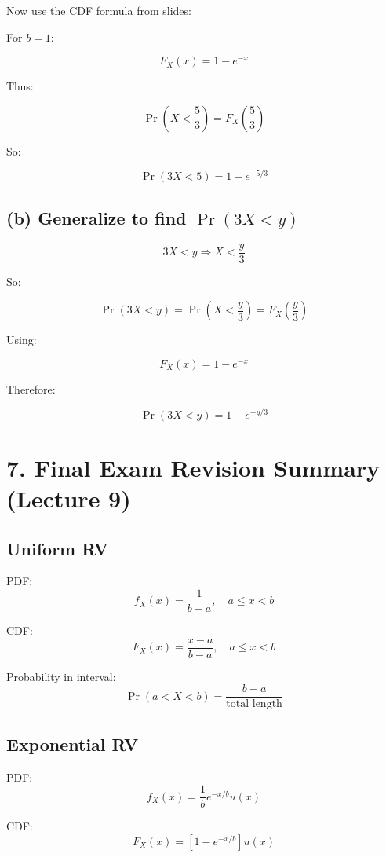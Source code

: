 \documentclass{article}
\begin{document}
Now use the CDF formula from slides:

For $b=1$:

\[
F_X(x)=1-e^{-x}
\]

Thus:

\[
\Pr\left(X<\frac{5}{3}\right)=F_X\left(\frac{5}{3}\right)
\]

So:

\[
\Pr(3X<5)=1-e^{-5/3}
\]

\subsection*{(b) Generalize to find $\Pr(3X<y)$}
\[
3X<y \Rightarrow X<\frac{y}{3}
\]

So:

\[
\Pr(3X<y)=\Pr\left(X<\frac{y}{3}\right)=F_X\left(\frac{y}{3}\right)
\]

Using:

\[
F_X(x)=1-e^{-x}
\]

Therefore:

\[
\Pr(3X<y)=1-e^{-y/3}
\]


\section*{7. Final Exam Revision Summary (Lecture 9)}

\subsection*{Uniform RV}

PDF:
\[
f_X(x)=\frac{1}{b-a}, \quad a\le x<b
\]

CDF:
\[
F_X(x)=\frac{x-a}{b-a}, \quad a\le x<b
\]

Probability in interval:
\[
\Pr(a<X<b)=\frac{b-a}{\text{total length}}
\]

\subsection*{Exponential RV}

PDF:
\[
f_X(x)=\frac{1}{b}e^{-x/b}u(x)
\]

CDF:
\[
F_X(x)=\left[1-e^{-x/b}\right]u(x)
\]
\end{document}
